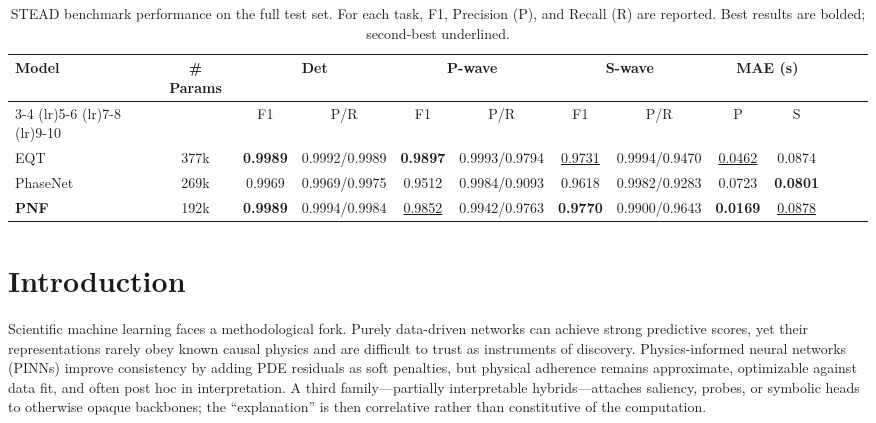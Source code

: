 \documentclass[twocolumn, 10pt]{article}
\begin{document}
\begin{table}[t]
\centering
\caption{STEAD benchmark performance on the full test set. For each task, F1, Precision (P), and Recall (R) are reported. Best results are bolded; second-best underlined.}
\label{tab:stead}
\begin{tabular}{l c c c c c c c c c c c c}
\toprule
\multirow{3}{*}{Model} & \multirow{3}{*}{\# Params} & \multicolumn{2}{c}{Det} & \multicolumn{2}{c}{P-wave} & \multicolumn{2}{c}{S-wave} & \multicolumn{2}{c}{MAE (s)} \\
\cmidrule(lr){3-4} \cmidrule(lr){5-6} \cmidrule(lr){7-8} \cmidrule(lr){9-10}
 & & F1 & P/R & F1 & P/R & F1 & P/R & P & S \\
\midrule
EQT & 377k & \textbf{0.9989} & 0.9992/0.9989 & \textbf{0.9897} & 0.9993/0.9794 & \underline{0.9731} & 0.9994/0.9470 & \underline{0.0462} & 0.0874 \\
PhaseNet & 269k & 0.9969 & 0.9969/0.9975 & 0.9512 & 0.9984/0.9093 & 0.9618 & 0.9982/0.9283 & 0.0723 & \textbf{0.0801} \\
\textbf{PNF} & 192k & \textbf{0.9989} & 0.9994/0.9984 & \underline{0.9852} & 0.9942/0.9763 & \textbf{0.9770} & 0.9900/0.9643 & \textbf{0.0169} & \underline{0.0878} \\
\bottomrule
\end{tabular}
\end{table}

\noindent

\section*{Introduction}

Scientific machine learning faces a methodological fork. Purely data-driven networks can achieve strong predictive scores, yet their representations rarely obey known causal physics and are difficult to trust as instruments of discovery. Physics-informed neural networks (PINNs)\cite{raissi2019pinn,karniadakis2021} improve consistency by adding PDE residuals as soft penalties, but physical adherence remains approximate, optimizable against data fit, and often post hoc in interpretation\cite{doumèche2025convergence}. A third family---partially interpretable hybrids---attaches saliency, probes, or symbolic heads to otherwise opaque backbones; the ``explanation'' is then correlative rather than constitutive of the computation\cite{vinuesa2023,ilievski2025}.
\end{document}
